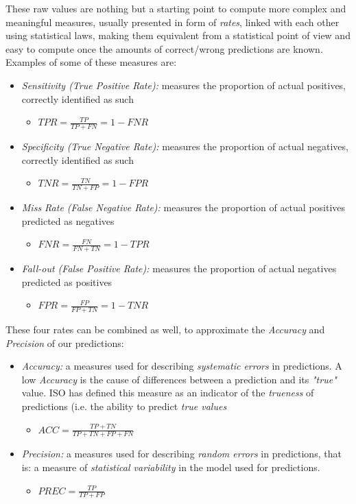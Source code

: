 \vspace{0.5cm}

These raw values are nothing but a starting point to compute more complex and meaningful measures, usually presented in form of \textsl{rates}, linked with each other using statistical laws, making them equivalent from a statistical point of view and easy to compute once the amounts of correct/wrong predictions are known. Examples of some of these measures are:

\begin{itemize}
	\item \textsl{Sensitivity (True Positive Rate):} measures the proportion of actual positives, correctly identified as such
	\begin{itemize}
		\item[] $TPR = \frac{TP}{TP+FN} = 1-FNR$
	\end{itemize}
	\item \textsl{Specificity (True Negative Rate):} measures the proportion of actual negatives, correctly identified as such
	\begin{itemize}
		\item[] $TNR = \frac{TN}{TN+FP} = 1-FPR$
	\end{itemize}
	\item \textsl{Miss Rate (False Negative Rate):} measures the proportion of actual positives predicted as negatives
	\begin{itemize}
		\item[] $FNR = \frac{FN}{FN+TN} = 1-TPR$
	\end{itemize}
	\item \textsl{Fall-out (False Positive Rate):} measures the proportion of actual negatives predicted as positives
	\begin{itemize}
		\item[] $FPR = \frac{FP}{FP+TN} = 1-TNR$
	\end{itemize}
\end{itemize}

These four rates can be combined as well, to approximate the \textsl{Accuracy} and \textsl{Precision} of our predictions:

\begin{itemize}
	\item \textsl{Accuracy:} a measures used for describing \textsl{systematic errors} in predictions. A low \textsl{Accuracy} is the cause of differences between a prediction and its \textsl{"true"} value. ISO has defined this measure as an indicator of the \textsl{trueness} of predictions (i.e. the ability to predict \textsl{true values}
	\begin{itemize}
		\item[] $ACC = \frac{TP+TN}{TP+TN+FP+FN}$
	\end{itemize}
	\item \textsl{Precision:} a measures used for describing \textsl{random errors} in predictions, that is: a measure of \textsl{statistical variability} in the model used for predictions.
	\begin{itemize}
	\item[] $PREC = \frac{TP}{TP+FP}$
	\end{itemize}
\end{itemize}


